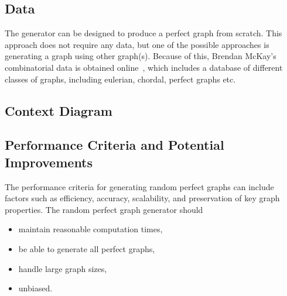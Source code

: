 \newpage

\subsection{Data}

The generator can be designed to produce a perfect graph from scratch. This approach does not require any data, but one of the possible approaches is generating a graph using other graph(s). Because of this, Brendan McKay's combinatorial data is obtained online~\cite{mckay}, which includes a database of different classes of graphs, including eulerian, chordal, perfect graphs etc.

\subsection{Context Diagram}



\subsection{Performance Criteria and Potential Improvements}

The performance criteria for generating random perfect graphs can include factors such as efficiency, accuracy, scalability, and preservation of key graph properties. The random perfect graph generator should
\begin{itemize}
    \item maintain reasonable computation times,
    \item be able to generate all perfect graphs,
    \item handle large graph sizes,
    \item unbiased.
\end{itemize}